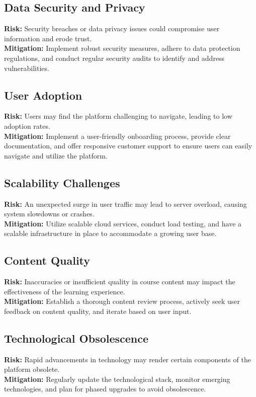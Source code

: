 \subsection{Data Security and Privacy}
\textbf{Risk:} Security breaches or data privacy issues could compromise user information and erode trust. \\
\textbf{Mitigation:} Implement robust security measures, adhere to data protection regulations, and conduct regular security audits to identify and address vulnerabilities.

\subsection{User Adoption}
\textbf{Risk:} Users may find the platform challenging to navigate, leading to low adoption rates. \\
\textbf{Mitigation:} Implement a user-friendly onboarding process, provide clear documentation, and offer responsive customer support to ensure users can easily navigate and utilize the platform.

\subsection{Scalability Challenges}
\textbf{Risk:} An unexpected surge in user traffic may lead to server overload, causing system slowdowns or crashes. \\
\textbf{Mitigation:} Utilize scalable cloud services, conduct load testing, and have a scalable infrastructure in place to accommodate a growing user base.

\subsection{Content Quality}
\textbf{Risk:} Inaccuracies or insufficient quality in course content may impact the effectiveness of the learning experience. \\
\textbf{Mitigation:} Establish a thorough content review process, actively seek user feedback on content quality, and iterate based on user input.

\subsection{Technological Obsolescence}
\textbf{Risk:} Rapid advancements in technology may render certain components of the platform obsolete. \\
\textbf{Mitigation:} Regularly update the technological stack, monitor emerging technologies, and plan for phased upgrades to avoid obsolescence.

